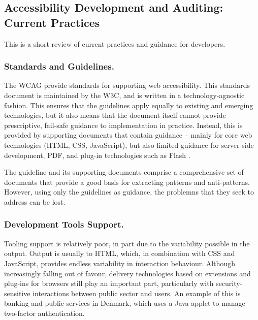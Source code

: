 
\subsection{Accessibility Development and Auditing: Current Practices} %
\label{sub:state_of_the_art}

This is a short review of current practices and guidance for developers.

\subsubsection{Standards and Guidelines.} %
	\label{ssub:standards_}
	The \ac{WCAG} \cite{wcag:2008} provide standards for supporting web accessibility. This standards document is maintained by the \ac{W3C}, and is written in a technology-agnostic fashion. This ensures that the guidelines apply equally to existing and emerging technologies, but it also means that the document itself cannot provide prescriptive, fail-safe guidance to implementation in practice. Instead, this is provided by supporting documents that contain guidance -- mainly for core web technologies (HTML, CSS, JavaScript), but also limited guidance for server-side development, PDF, and plug-in technologies such as Flash \cite{wcagtechs:2012}.

	The guideline and its supporting documents comprise a comprehensive set of documents that provide a good basis for extracting patterns and anti-patterns. However, using only the guidelines as guidance, the problemns that they seek to address can be lost. 


\subsubsection{Development Tools Support.} %
	\label{ssub:development_tools_support_}
	Tooling support is relatively poor, in part due to the variability possible in the output. Output is usually to HTML, which, in combination with CSS and JavaScript, provides endless variability in interaction behaviour. Although increasingly falling out of favour, delivery technologies based on extensions and plug-ins for browsers still play an important part, particularly with security-sensitive interactions between public sector and users. An example of this is banking and public services in Denmark, which uses a Java applet to manage two-factor authentication.

